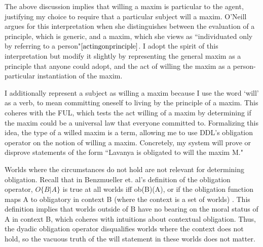 \begin{isabellebody}
\begin{isamarkuptext}
The above discussion implies that willing a maxim is particular to the agent, justifying my choice to 
require that a particular subject will a maxim. O'Neill argues for this interpretation when she distinguishes 
between the evaluation of a principle, which is generic, and a maxim, which she views as ``individuated only 
by referring to a person"$\cite[13]{actingonprinciple}$. I adopt the spirit of this interpretation but modify it slightly 
by representing the general maxim as a principle that anyone could adopt, and the act of willing the maxim 
as a person-particular instantiation of the maxim.

I additionally represent a subject as willing a maxim because I use the word `will' as a verb, to mean committing oneself to living by
the principle of a maxim. This coheres with the FUL, which tests the act willing 
of a maxim by determining if the maxim could be a universal law that everyone committed to. Formalizing this idea,
the type of a willed maxim is a term, allowing me
to use DDL's obligation operator on the notion of willing a maxim. Concretely, my system will prove 
or disprove statements of the form ``Lavanya is obligated to will the maxim M." 

Worlds where the circumstances do not hold are not relevant for determining obligation. Recall that in 
Benzmueller et. al's definition of the obligation operator,  $O \{B|A\}$ is true at all worlds iff ob(B)(A), or 
if the obligation function maps A to obligatory in context B (where the context is a set of worlds) \cite{BFP}. This 
definition implies that worlds outside of B have no bearing on the moral status of A in context B, which 
coheres with intuitions about contextual obligation. Thus, the dyadic obligation operator 
disqualifies worlds where the context does not hold, so the vacuous truth of the will statement in 
these worlds does not matter. 


\end{isamarkuptext}
\end{isabellebody}

